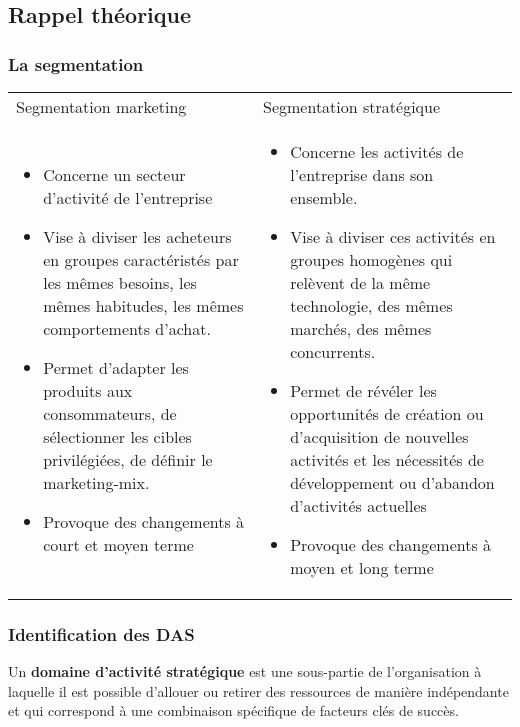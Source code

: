 \subsection{Rappel théorique}
	\subsubsection{La segmentation}
	\begin{table}[!ht]
		\begin{center}
			\begin{tabular}{p{7.5cm}|p{7.5cm}}
			Segmentation marketing & Segmentation stratégique \\
			\begin{itemize}
				\item Concerne un secteur d'activité de l'entreprise
	 			\item Vise à diviser les acheteurs en groupes caractéristés par les mêmes besoins, les mêmes habitudes, les mêmes comportements d'achat.
	 			\item Permet d'adapter les produits aux consommateurs, de sélectionner les cibles privilégiées, de définir le marketing-mix.
	 			\item Provoque des changements à court et moyen terme
			\end{itemize}
			&
			\begin{itemize}
	 			\item Concerne les activités de l'entreprise dans son ensemble.
	 			\item Vise à diviser ces activités en groupes homogènes qui relèvent de la même technologie, des mêmes marchés, des mêmes concurrents.
	 			\item Permet de révéler les opportunités de création ou d'acquisition de nouvelles activités et les nécessités de développement ou d'abandon d'activités actuelles
	 			\item Provoque des changements à moyen et long terme
			\end{itemize}
			\\
			\end{tabular}
		\end{center}
	\end{table}
	\subsubsection{Identification des DAS}
	Un \textbf{domaine d'activité stratégique} est une sous-partie de l'organisation à laquelle il est possible d'allouer ou retirer des ressources de manière indépendante et qui correspond à une combinaison spécifique de facteurs clés de succès. \newline

